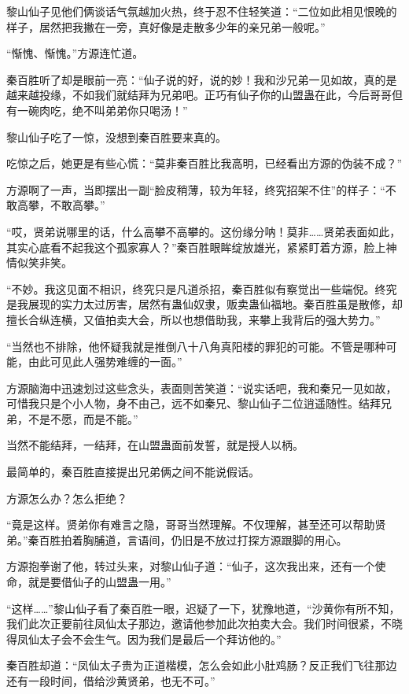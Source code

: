 \begin{this_body}
黎山仙子见他们俩谈话气氛越加火热，终于忍不住轻笑道：“二位如此相见恨晚的样子，居然把我撇在一旁，真好像是走散多少年的亲兄弟一般呢。”

“惭愧、惭愧。”方源连忙道。

秦百胜听了却是眼前一亮：“仙子说的好，说的妙！我和沙兄弟一见如故，真的是越来越投缘，不如我们就结拜为兄弟吧。正巧有仙子你的山盟蛊在此，今后哥哥但有一碗肉吃，绝不叫弟弟你只喝汤！”

黎山仙子吃了一惊，没想到秦百胜要来真的。

吃惊之后，她更是有些心慌：“莫非秦百胜比我高明，已经看出方源的伪装不成？”

方源啊了一声，当即摆出一副“脸皮稍薄，较为年轻，终究招架不住”的样子：“不敢高攀，不敢高攀。”

“哎，贤弟说哪里的话，什么高攀不高攀的。这份缘分呐！莫非……贤弟表面如此，其实心底看不起我这个孤家寡人？”秦百胜眼眸绽放雄光，紧紧盯着方源，脸上神情似笑非笑。

“不妙。我这见面不相识，终究只是凡道杀招，秦百胜似有察觉出一些端倪。终究是我展现的实力太过厉害，居然有蛊仙奴隶，贩卖蛊仙福地。秦百胜虽是散修，却擅长合纵连横，又值拍卖大会，所以也想借助我，来攀上我背后的强大势力。”

“当然也不排除，他怀疑我就是推倒八十八角真阳楼的罪犯的可能。不管是哪种可能，由此可见此人强势难缠的一面。”

方源脑海中迅速划过这些念头，表面则苦笑道：“说实话吧，我和秦兄一见如故，可惜我只是个小人物，身不由己，远不如秦兄、黎山仙子二位逍遥随性。结拜兄弟，不是不愿，而是不能。”

当然不能结拜，一结拜，在山盟蛊面前发誓，就是授人以柄。

最简单的，秦百胜直接提出兄弟俩之间不能说假话。

方源怎么办？怎么拒绝？

“竟是这样。贤弟你有难言之隐，哥哥当然理解。不仅理解，甚至还可以帮助贤弟。”秦百胜拍着胸脯道，言语间，仍旧是不放过打探方源跟脚的用心。

方源抱拳谢了他，转过头来，对黎山仙子道：“仙子，这次我出来，还有一个使命，就是要借仙子的山盟蛊一用。”

“这样……”黎山仙子看了秦百胜一眼，迟疑了一下，犹豫地道，“沙黄你有所不知，我们此次正要前往凤仙太子那边，邀请他参加此次拍卖大会。我们时间很紧，不晓得凤仙太子会不会生气。因为我们是最后一个拜访他的。”

秦百胜却道：“凤仙太子贵为正道楷模，怎么会如此小肚鸡肠？反正我们飞往那边还有一段时间，借给沙黄贤弟，也无不可。”


\end{this_body}
